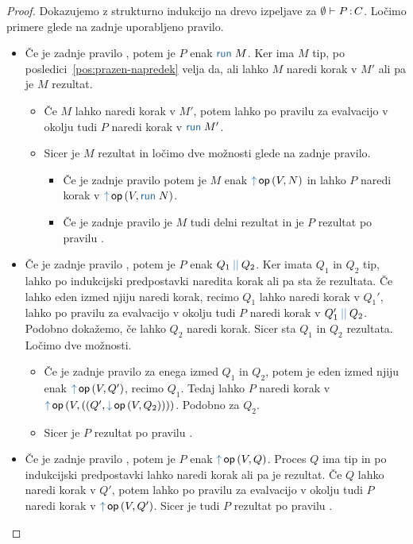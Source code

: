 \begin{proof}
	Dokazujemo z strukturno indukcijo na drevo izpeljave za $\emptyset \vdash P \mathinner{:} C$.
	Ločimo primere glede na zadnje uporabljeno pravilo.
	
	\begin{itemize}
		\item Če je zadnje pravilo , potem je $P$ enak $\tmrun{M}$.
		Ker ima $M$ tip, po posledici~\ref{pos:prazen-napredek} velja da, ali lahko $M$ naredi korak v $M'$ ali pa je $M$ rezultat.
		\begin{itemize}
			\item Če $M$ lahko naredi korak v $M'$, potem lahko po pravilu za evalvacijo v okolju tudi $P$ naredi korak v $\tmrun{M'}$.
			\item Sicer je $M$ rezultat in ločimo dve možnosti glede na zadnje pravilo.
			\begin{itemize}
				\item Če je zadnje pravilo  potem je $M$ enak $\tmopout{op}{V}{N}$ in lahko $P$ naredi korak v $\tmopout{op}{V}{\tmrun{N}}$.
				\item Če je zadnje pravilo  je $M$ tudi delni rezultat in je $P$ rezultat po pravilu .
			\end{itemize}
		\end{itemize}
		
		\item Če je zadnje pravilo , potem je $P$ enak $\tmpar{Q_1}{Q_2}$. Ker imata $Q_1$ in $Q_2$ tip, lahko po indukcijski predpostavki naredita korak ali pa sta že rezultata.
		Če lahko eden izmed njiju naredi korak, recimo $Q_1$ lahko naredi korak v $Q_1'$, lahko po pravilu za evalvacijo v okolju tudi $P$ naredi korak v $\tmpar{Q_1'}{Q_2}$. Podobno dokažemo, če lahko $Q_2$ naredi korak.
		Sicer sta $Q_1$ in $Q_2$ rezultata. Ločimo dve možnosti.
		\begin{itemize}
			\item Če je zadnje pravilo  za enega izmed $Q_1$ in $Q_2$, potem je eden izmed njiju enak $\tmopout{op}{V}{Q'}$, recimo $Q_1$. Tedaj lahko $P$ naredi korak v $\tmopout{op}{V}{(\tmpair{Q'}{\tmopin{op}{V}{Q_2}})}$. Podobno za $Q_2$.
			\item Sicer je $P$ rezultat po pravilu .
		\end{itemize}
		
		\item Če je zadnje pravilo , potem je $P$ enak $\tmopout{op}{V}{Q}$. Proces $Q$ ima tip in po indukcijski predpostavki lahko naredi korak ali pa je rezultat.
		Če $Q$ lahko naredi korak v $Q'$, potem lahko po pravilu za evalvacijo v okolju tudi $P$ naredi korak v $\tmopout{op}{V}{Q'}$.
		Sicer je tudi $P$ rezultat po pravilu .
		

\end{itemize}
\end{proof}
